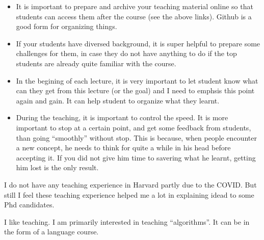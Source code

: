 \documentclass[a4paper]{article}
\newcommand{\<}{\langle}
\renewcommand{\>}{\rangle}
\begin{document}
\begin{itemize}
    \item It is important to prepare and archive your teaching material online so that students can access them after the course (see the above links). Github is a good form for organizing things.
    \item If your students have diversed background, it is super helpful to prepare some challenges for them, in case they do not have anything to do if the top students are already quite familiar with the course.
    \item In the begining of each lecture, it is very important to let student know what can they get from this lecture (or the goal) and I need to emphsis this point again and gain.
It can help student to organize what they learnt.
    \item During the teaching, it is important to control the speed.
It is more important to stop at a certain point, and get some feedback from students, than going ``smoothly'' without stop.
This is because, when people encounter a new concept, he needs to think for quite a while in his head before accepting it.
If you did not give him time to savering what he learnt, getting him lost is the only result.
\end{itemize}

I do not have any teaching experience in Harvard partly due to the COVID.
But still I feel these teaching experience helped me a lot in explaining idead to some Phd candidates.

I like teaching. I am primarily interested in teaching ``algorithms''.
It can be in the form of a language course.
\end{document}
